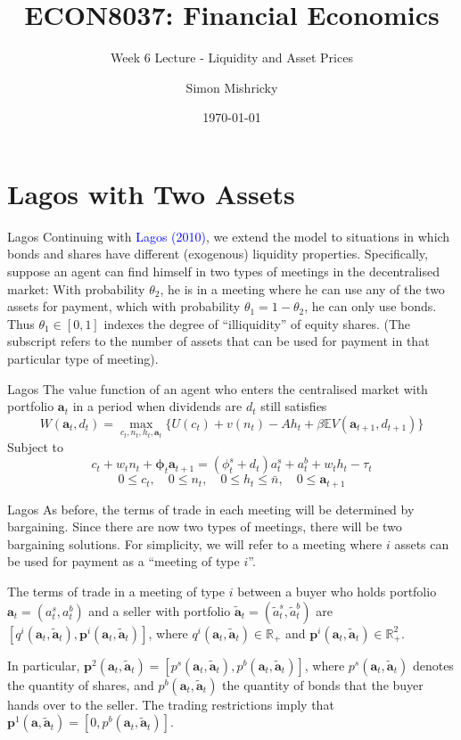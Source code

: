 \documentclass[aspectratio=169,xcolor=dvipsnames]{beamer}
\title{ECON8037: Financial Economics}
\subtitle{\normalsize Week 6 Lecture - Liquidity and Asset Prices}
\author{Simon Mishricky}
\institute{Research School of Economics, Australian National University}
\date{\today}
\begin{document}
\section{Lagos with Two Assets}
\frame{\titlepage}

\begin{frame}{Lagos}
    Continuing with \textcolor{blue}{Lagos (2010)}, we extend the model to situations in which bonds and shares have different (exogenous) liquidity properties. Specifically, suppose an agent can find himself in two types of meetings in the decentralised market: With probability $\theta_2$, he is in a meeting where he can use any of the two assets for payment, which with probability $\theta_1 = 1 - \theta_2$, he can only use bonds. Thus $\theta_1 \in [0, 1]$ indexes the degree of ``illiquidity'' of equity shares. (The subscript refers to the number of assets that can be used for payment in that particular type of meeting).
\end{frame}

\begin{frame}{Lagos}
    The value function of an agent who enters the centralised market with portfolio $\mathbf{a}_t$ in a period when dividends are $d_t$ still satisfies
    \[
        W(\mathbf{a}_t, d_t) = \max_{c_t, n_t, h_t, \mathbf{a}_t} \{U(c_t) + v(n_t) - A h_t + \beta \mathbb{E} V(\mathbf{a}_{t+1}, d_{t+1})\}
    \]
    Subject to
    \[
        c_t + w_t n_t + \boldsymbol{\phi}_t \mathbf{a}_{t+1} = (\phi^s_t + d_t) a^s_t + a^b_t + w_t h_t - \tau_t
    \]
    \[
        0 \le c_t, \quad 0 \le n_t, \quad 0 \le h_t \le \bar n, \quad 0 \le \mathbf{a}_{t+1}
    \]
\end{frame}

\begin{frame}{Lagos}
    As before, the terms of trade in each meeting will be determined by bargaining. Since there are now two types of meetings, there will be two bargaining solutions. For simplicity, we will refer to a meeting where $i$ assets can be used for payment as a ``meeting of type $i$''.

    The terms of trade in a meeting of type $i$ between a buyer who holds portfolio $\mathbf{a}_t = (a^s_t, a^b_t)$ and a seller with portfolio $\tilde{\mathbf{a}}_t = (\tilde a^s_t, \tilde a^b_t)$ are $[q^i(\mathbf{a}_t, \tilde{\mathbf{a}}_t), \mathbf{p}^i(\mathbf{a}_t, \tilde{\mathbf{a}}_t)]$, where $q^i(\mathbf{a}_t, \tilde{\mathbf{a}}_t) \in \mathbb{R}_+$ and $\mathbf{p}^i(\mathbf{a}_t, \tilde{\mathbf{a}}_t) \in \mathbb{R}^2_+$.

    In particular, $\mathbf{p}^2(\mathbf{a}_t, \tilde{\mathbf{a}}_t) = [p^s(\mathbf{a}_t, \tilde{\mathbf{a}}_t), p^b(\mathbf{a}_t, \tilde{\mathbf{a}}_t)]$, where $p^s(\mathbf{a}_t, \tilde{\mathbf{a}}_t)$ denotes the quantity of shares, and $p^b(\mathbf{a}_t, \tilde{\mathbf{a}}_t)$ the quantity of bonds that the buyer hands over to the seller. The trading restrictions imply that $\mathbf{p}^1(\mathbf{a}, \tilde{\mathbf{a}}_t) = [0, p^b(\mathbf{a}_t, \tilde{\mathbf{a}}_t)]$.
\end{frame}
\end{document}

